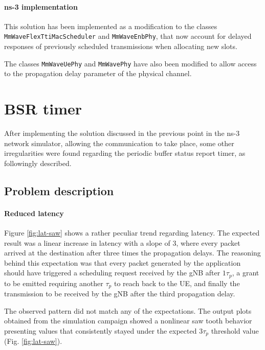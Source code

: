 \paragraph{ns-3 implementation}
This solution has been implemented as a modification to the classes \texttt{MmWaveFlexTtiMacScheduler} and \texttt{MmWaveEnbPhy}, that now account for delayed responses of previously scheduled transmissions when allocating new slots.

The classes \texttt{MmWaveUePhy} and \texttt{MmWavePhy} have also been modified to allow access to the propagation delay parameter of the physical channel.

\section{BSR timer}
\label{sec:bsr-timer}
After implementing the solution discussed in the previous point in the ns-3 network simulator, allowing the communication to take place, some other irregularities were found regarding the periodic buffer status report timer, as followingly described. 

\subsection{Problem description}

\paragraph{Reduced latency}

Figure \ref{fig:lat-saw} shows a rather peculiar trend regarding latency. The expected result was a linear increase in latency with a slope of 3, where every packet arrived at the destination after three times the propagation delays. The reasoning behind this expectation was that every packet generated by the application should have triggered a scheduling request received by the \ac{gNB} after $1\tau_p$, a grant to be emitted requiring another $\tau_p$ to reach back to the \ac{UE}, and finally the transmission to be received by the \ac{gNB} after the third propagation delay.

The observed pattern did not match any of the expectations. The output plots obtained from the simulation campaign showed a nonlinear saw tooth behavior presenting values that consistently stayed under the expected $3\tau_p$ threshold value (Fig. \ref{fig:lat-saw}).

